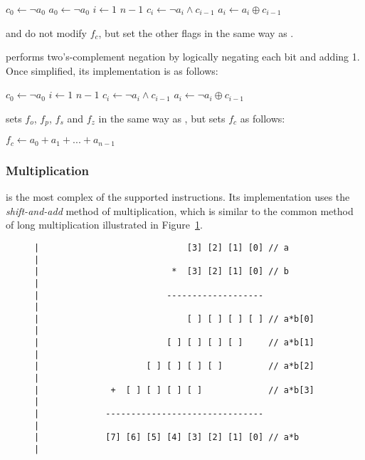 \documentclass[a4paper,11pt]{kth-mag}
\renewcommand{\gets}{\leftarrow}
\newcommand{\AND}{\land}
\newcommand{\XOR}{\oplus}
\newcommand{\NOT}{\lnot}
\begin{document}
\begin{codebox}
\zi $c_0 \gets \NOT a_0$
\zi $a_0 \gets \NOT a_0$
\zi \For $i \gets 1$ \To $n-1$
\zi \Do
      $c_i \gets \NOT a_i \AND c_{i-1}$
\zi   $a_i \gets a_i \XOR c_{i-1}$
    \End
\end{codebox}

 and  do not modify $f_c$, but set the other flags in the same way as .

 performs two's-complement negation by logically negating each bit and adding 1.
Once simplified, its implementation is as follows:

\begin{codebox}
\zi $c_0 \gets \NOT a_0$
\zi \For $i \gets 1$ \To $n-1$
\zi \Do
      $c_i \gets \NOT a_i \AND c_{i-1}$
\zi   $a_i \gets \NOT a_i \XOR c_{i-1}$
    \End
\end{codebox}

 sets $f_o$, $f_p$, $f_s$ and $f_z$ in the same way as , but sets $f_c$ as follows:

\begin{codebox}
\zi $f_c \gets a_0 + a_1 + ... + a_{n-1}$
\end{codebox}

\subsubsection{Multiplication}

 is the most complex of the supported instructions.
Its implementation uses the \emph{shift-and-add} method of multiplication, which is similar to the common method of long multiplication illustrated in Figure~\ref{fig:shift_and_add}.

\begin{figure}
\centering
\begin{verbatim}
|                             [3] [2] [1] [0] // a                  |
|                          *  [3] [2] [1] [0] // b                  |
|                         -------------------                       |
|                             [ ] [ ] [ ] [ ] // a*b[0]             |
|                         [ ] [ ] [ ] [ ]     // a*b[1]             |
|                     [ ] [ ] [ ] [ ]         // a*b[2]             |
|              +  [ ] [ ] [ ] [ ]             // a*b[3]             |
|             -------------------------------                       |
|             [7] [6] [5] [4] [3] [2] [1] [0] // a*b                |
\end{verbatim}
\caption{}
\label{fig:shift_and_add}
\end{figure}
\end{document}
